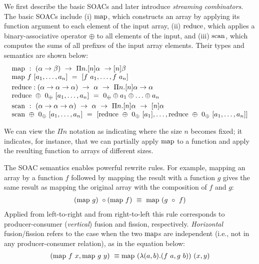 We first describe the basic SOACs and later introduce
\textit{streaming combinators}. The basic SOACs include (i) $\mathrm{map}$,
which constructs an array by applying its function argument to each
element of the input array, (ii) $\mathrm{reduce}$, which applies a
binary-associative operator $\oplus$ to all elements of the input, and
(iii) $\mathrm{scan}$, which computes the sums of all prefixes of the input
array elements.  Their types and semantics are shown below:
%
\[ \begin{array}{l}
\cmap ~ : ~ (\alpha \to \beta) ~ \to ~ \Pi n. [n]\alpha ~ \to [n]\beta \\
\cmap ~ f ~ [a_1, \ldots, a_n] ~ = ~ [f ~ a_1, \ldots, f ~ a_n]\smallskip\\
\creduce : (\alpha \to \alpha \to \alpha) ~ \to ~ \alpha ~ \to ~ \Pi n.[n]\alpha \to \alpha\\
\creduce ~ \oplus ~ 0_{\oplus} ~ [a_1, \ldots, a_n] ~ = ~ 0_{\oplus} \oplus a_1 \oplus \ldots \oplus a_n\smallskip\\
\cscan ~ : ~ (\alpha \to \alpha \to \alpha) ~ \to ~ \alpha ~ \to ~ \Pi n.[n]\alpha ~ \to ~ [n]\alpha\\
\cscan ~ \oplus ~ 0_{\oplus} ~ [a_1, \ldots, a_n] ~ = ~ [\creduce~\oplus~0_{\oplus}~[a_1], \ldots, \creduce~\oplus~0_{\oplus}~[a_1, \ldots, a_n] ]\\
\end{array} \]

\noindent We can view the $\Pi n$ notation as indicating where the
size $n$ becomes fixed; it indicates, for instance, that we can
partially apply $\mathrm{map}$ to a function and apply the resulting function
to arrays of different sizes.

%

The SOAC semantics enables powerful rewrite rules.  For example,
mapping an array by a function $f$ followed by mapping the result
with a function $g$ gives the same result as mapping the original
array with the composition of $f$ and $g$:
\[ \begin{array}{l}
(\mathrm{map} ~ g) ~ \circ (\mathrm{map} ~ f) ~ \equiv ~ \mathrm{map} ~ (g ~ \circ ~ f)
\end{array} \]
Applied from left-to-right and from right-to-left this
rule corresponds to producer-consumer (\textit{vertical}) fusion and fission,
respectively.
%
\textit{Horizontal} fusion/fission refers to the case when the two
$\mathrm{map}{}$s are independent (i.e., not in any producer-consumer
relation), as in the equation below:
\[ \begin{array}{l}
(\mathrm{map} ~ f ~ x, \mathrm{map} ~ g ~ y) ~ \equiv\mathrm{map} ~ (\lambda(a,b).(f~a,g~b)) ~ (x,y)
\end{array} \]

